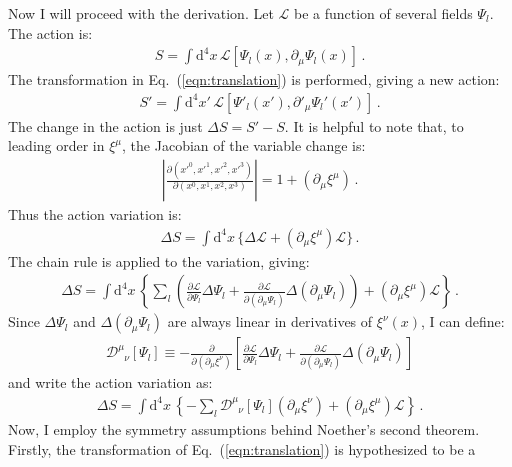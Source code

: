 \documentclass[prd,preprint,
  showpacs,showkeys,lengthcheck,
  nofootinbib,tightenlines,onecolumn,notitlepage,
  preprintnumbers,superscriptaddress]{revtex4-1}
\newcommand{\Lag}{\ensuremath{\mathscr{L}}}
\newcommand{\dx}{\ensuremath{\xi}}
\begin{document}
Now I will proceed with the derivation.
Let $\Lag$ be a function of several fields $\Psi_l$.
The action is:
\begin{align}
  S
  =
  \int \mathrm{d}^4x \,
  \Lag[\Psi_l(x),\partial_\mu\Psi_l(x)]
  \,.
\end{align}
The transformation in Eq.~(\ref{eqn:translation}) is performed,
giving a new action:
\begin{align}
  S'
  =
  \int \mathrm{d}^4x' \,
  \Lag[\Psi'_l(x'),\partial'_\mu\Psi_l'(x')]
  \,.
\end{align}
The change in the action is just $\Delta S = S' - S$.
It is helpful to note that, to leading order in $\dx^\mu$,
the Jacobian of the variable change is:
\begin{align}
  \left| \frac{\partial (x'^0,x'^1,x'^2,x'^3) }{\partial (x^0,x^1,x^2,x^3) } \right|
  =
  1 + (\partial_\mu \dx^\mu)
  \,.
\end{align}
Thus the action variation is:
\begin{align}
  \Delta S
  =
  \int \mathrm{d}^4x \,
  \Big\{
    \Delta \Lag
    +
    (\partial_\mu \dx^\mu)
    \Lag
    \Big\}
  \,.
\end{align}
The chain rule is applied to the variation, giving:
\begin{align}
  \Delta S
  =
  \int \mathrm{d}^4x \,
  \left\{
    \sum_l \left(
    \frac{\partial\Lag}{\partial \Psi_l}
    \Delta \Psi_l
    +
    \frac{\partial\Lag}{\partial (\partial_\mu\Psi_l)}
    \Delta (\partial_\mu\Psi_l)
    \right)
    +
    (\partial_\mu \dx^\mu) \Lag
    \right\}
  \,.
\end{align}
Since $\Delta\Psi_l$ and $\Delta(\partial_\mu\Psi_l)$ are always linear in
derivatives of $\dx^\nu(x)$, I can define:
\begin{align}
  \label{eqn:D}
  \mathscr{D}^{\mu}_{\phantom{\mu}\nu}[\Psi_l]
  \equiv
  -
  \frac{\partial}{\partial(\partial_\mu\dx^\nu)}
  \left[
    \frac{\partial\Lag}{\partial \Psi_l}
    \Delta \Psi_l
    +
    \frac{\partial\Lag}{\partial (\partial_\mu\Psi_l)}
    \Delta (\partial_\mu\Psi_l)
    \right]
\end{align}
and write the action variation as:
\begin{align}
  \Delta S
  =
  \int \mathrm{d}^4x \,
  \left\{
    -
    \sum_l
    \mathscr{D}^{\mu}_{\phantom{\mu}\nu}[\Psi_l]
    (\partial_\mu \dx^\nu)
    +
    (\partial_\mu \dx^\mu) \Lag
    \right\}
  \,.
\end{align}
Now, I employ the symmetry assumptions behind Noether's second theorem.
Firstly, the transformation of Eq.~(\ref{eqn:translation}) is hypothesized to be a
\end{document}

